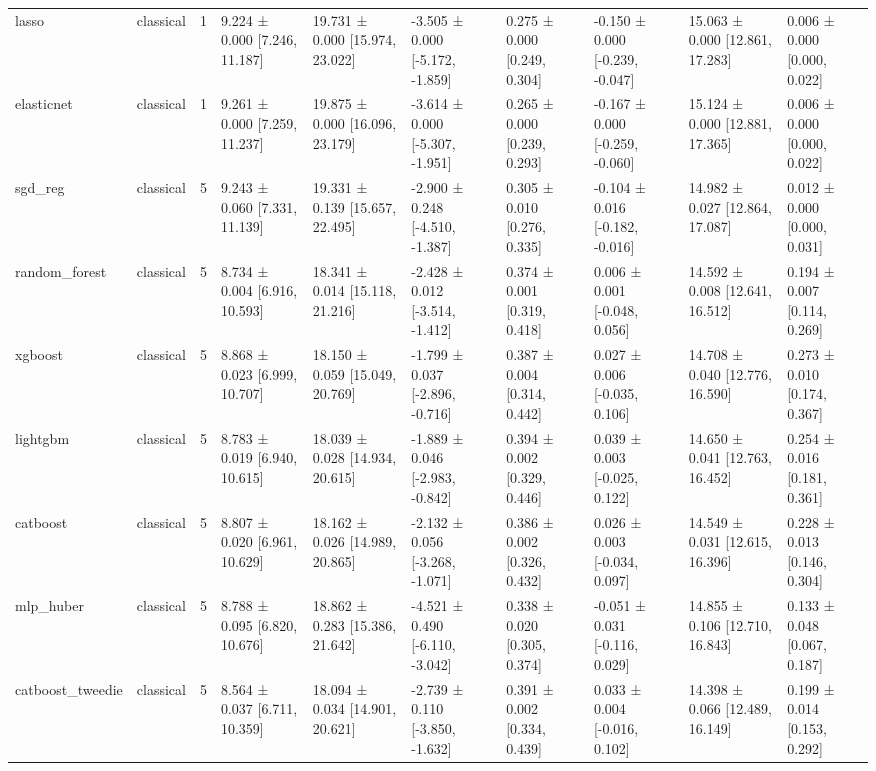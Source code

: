 \begin{table}
\begin{tabular}{llrlllllll}
lasso & classical & 1 & 9.224 ± 0.000 [7.246, 11.187] & 19.731 ± 0.000 [15.974, 23.022] & -3.505 ± 0.000 [-5.172, -1.859] & 0.275 ± 0.000 [0.249, 0.304] & -0.150 ± 0.000 [-0.239, -0.047] & 15.063 ± 0.000 [12.861, 17.283] & 0.006 ± 0.000 [0.000, 0.022] \\
elasticnet & classical & 1 & 9.261 ± 0.000 [7.259, 11.237] & 19.875 ± 0.000 [16.096, 23.179] & -3.614 ± 0.000 [-5.307, -1.951] & 0.265 ± 0.000 [0.239, 0.293] & -0.167 ± 0.000 [-0.259, -0.060] & 15.124 ± 0.000 [12.881, 17.365] & 0.006 ± 0.000 [0.000, 0.022] \\
sgd\_reg & classical & 5 & 9.243 ± 0.060 [7.331, 11.139] & 19.331 ± 0.139 [15.657, 22.495] & -2.900 ± 0.248 [-4.510, -1.387] & 0.305 ± 0.010 [0.276, 0.335] & -0.104 ± 0.016 [-0.182, -0.016] & 14.982 ± 0.027 [12.864, 17.087] & 0.012 ± 0.000 [0.000, 0.031] \\
random\_forest & classical & 5 & 8.734 ± 0.004 [6.916, 10.593] & 18.341 ± 0.014 [15.118, 21.216] & -2.428 ± 0.012 [-3.514, -1.412] & 0.374 ± 0.001 [0.319, 0.418] & 0.006 ± 0.001 [-0.048, 0.056] & 14.592 ± 0.008 [12.641, 16.512] & 0.194 ± 0.007 [0.114, 0.269] \\
xgboost & classical & 5 & 8.868 ± 0.023 [6.999, 10.707] & 18.150 ± 0.059 [15.049, 20.769] & -1.799 ± 0.037 [-2.896, -0.716] & 0.387 ± 0.004 [0.314, 0.442] & 0.027 ± 0.006 [-0.035, 0.106] & 14.708 ± 0.040 [12.776, 16.590] & 0.273 ± 0.010 [0.174, 0.367] \\
lightgbm & classical & 5 & 8.783 ± 0.019 [6.940, 10.615] & 18.039 ± 0.028 [14.934, 20.615] & -1.889 ± 0.046 [-2.983, -0.842] & 0.394 ± 0.002 [0.329, 0.446] & 0.039 ± 0.003 [-0.025, 0.122] & 14.650 ± 0.041 [12.763, 16.452] & 0.254 ± 0.016 [0.181, 0.361] \\
catboost & classical & 5 & 8.807 ± 0.020 [6.961, 10.629] & 18.162 ± 0.026 [14.989, 20.865] & -2.132 ± 0.056 [-3.268, -1.071] & 0.386 ± 0.002 [0.326, 0.432] & 0.026 ± 0.003 [-0.034, 0.097] & 14.549 ± 0.031 [12.615, 16.396] & 0.228 ± 0.013 [0.146, 0.304] \\
mlp\_huber & classical & 5 & 8.788 ± 0.095 [6.820, 10.676] & 18.862 ± 0.283 [15.386, 21.642] & -4.521 ± 0.490 [-6.110, -3.042] & 0.338 ± 0.020 [0.305, 0.374] & -0.051 ± 0.031 [-0.116, 0.029] & 14.855 ± 0.106 [12.710, 16.843] & 0.133 ± 0.048 [0.067, 0.187] \\
catboost\_tweedie & classical & 5 & 8.564 ± 0.037 [6.711, 10.359] & 18.094 ± 0.034 [14.901, 20.621] & -2.739 ± 0.110 [-3.850, -1.632] & 0.391 ± 0.002 [0.334, 0.439] & 0.033 ± 0.004 [-0.016, 0.102] & 14.398 ± 0.066 [12.489, 16.149] & 0.199 ± 0.014 [0.153, 0.292] \\

\end{tabular}
\end{table}
